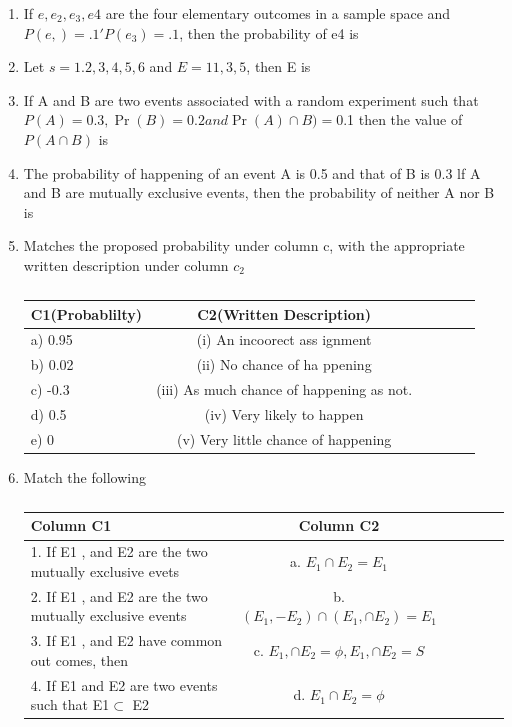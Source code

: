 \documentclass[12pt]{article}
\providecommand{\pr}[1]{\ensuremath{\Pr\left(#1\right)}}
\begin{document}
\begin{enumerate}
\item If $e, e_2, e_3, e4$ are the four elementary outcomes in a sample space and $P(e,)=.1 'P(e_3)=.1$, then the probability of e4 is
\item Let $s={1.2,3,4,5,6}$ and $E={11,3,5}$, then E is
\item If A and B are two events associated  with a random experiment such that $P(A)=0.3, \pr{B}=0.2 and \pr A\cap B)=0$.1 then the value of $P(A\cap B)$ is
\item The probability of happening of an event A is 0.5 and that of B is 0.3 lf A and B are mutually exclusive events, then the probability of neither A nor B is
\item Matches the proposed probability under column c, with the appropriate written description under column $c_2$
\begin{table}[htbp]
 \begin{center}
    \begin{tabular}{|l|c|c|c|c|c}
\hline \textbf{C1(Probablilty)}
  & \textbf{C2(Written Description)
}  \\ \hline
     a) 0.95 & (i) An incoorect ass
ignment\\
     b) 0.02 & (ii) No chance of ha
ppening\\                               c) -0.3 & (iii) As much chance of happening as not.\\                 d) 0.5 & (iv) Very likely to happen\\                                 e) 0 & (v) Very little chance of happening\\ \hline              \end{tabular}                      \end{center}                       \caption{\label{table:dummytable} }\end{table}
\item Match the following          \begin{table}[htbp]                 \begin{center}                        \begin{tabular}{|l|c|c|c|c|c} \hline \textbf{Column C1}             & \textbf{Column C2}  \\ \hline       1. If E1 , and E2 are the two mutually exclusive evets & a.  $E_1
\cap E_2=E_1$\\                         2. If E1 , and E2 are the two
mutually exclusive events & b. $(E_1,-E_2)\cap (E_1,\cap E_2)=E_1$\\
     3. If E1 , and E2 have common out
comes, then & c.  $E_1,\cap E_2=\phi,E_1,\cap E_2=S$\\
     4. If E1 and E2 are two events
 such that E1$\subset$ E2 & d. $E_1
\cap E_2=\phi$\\  \hline
\end{tabular}
\end{center}                       \caption{\label{table:dummy} }     \end{table}
\end{enumerate}
\end{document}
